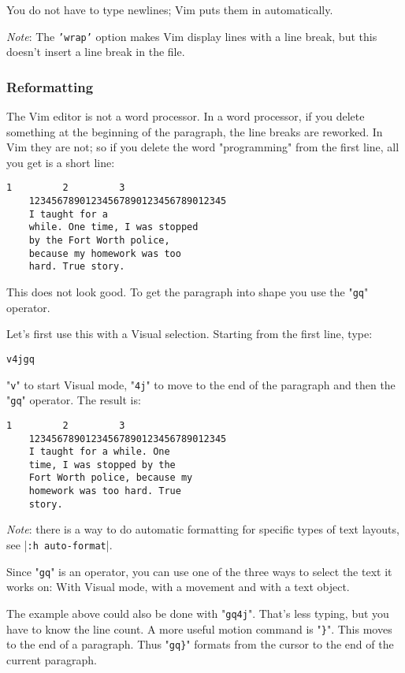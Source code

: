 You do not have to type newlines; Vim puts them in automatically.

\emph{Note}: The \texttt{'wrap'} option makes Vim display lines with a line break, but this doesn't insert a line break in the file.
\subsubsection{Reformatting}
The Vim editor is not a word processor.
In a word processor, if you delete something at the beginning of the paragraph, the line breaks are reworked.
In Vim they are not; so if you delete the word "programming" from the first line, all you get is a short line:

\begin{Verbatim}[samepage=true]
             1         2         3
    12345678901234567890123456789012345
    I taught for a 
    while. One time, I was stopped 
    by the Fort Worth police, 
    because my homework was too 
    hard. True story. 
\end{Verbatim}

This does not look good.
To get the paragraph into shape you use the "\texttt{gq}" operator.

Let's first use this with a Visual selection.
Starting from the first line, type:

\begin{Verbatim}[samepage=true]
 v4jgq
\end{Verbatim}

"\texttt{v}" to start Visual mode, "\texttt{4j}" to move to the end of the paragraph and then the "\texttt{gq}" operator.
The result is:

\begin{Verbatim}[samepage=true]
             1         2         3
    12345678901234567890123456789012345
    I taught for a while. One 
    time, I was stopped by the 
    Fort Worth police, because my 
    homework was too hard. True 
    story. 
\end{Verbatim}

\emph{Note}: there is a way to do automatic formatting for specific types of text layouts, see |\texttt{:h auto-format}|.

Since "\texttt{gq}" is an operator, you can use one of the three ways to select the text it works on: With Visual mode, with a movement and with a text object.

The example above could also be done with "\texttt{gq4j}".
That's less typing, but you have to know the line count.
A more useful motion command is "\texttt{\}}".
This moves to the end of a paragraph.
Thus "\texttt{gq\}}" formats from the cursor to the end of the current paragraph.

